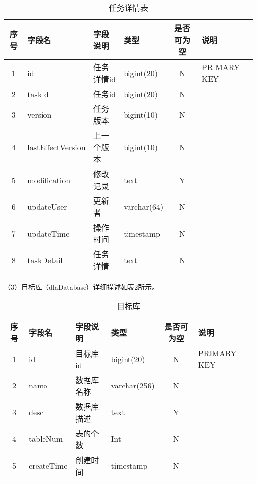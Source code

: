 \begin{table}[H]
  \centering
  \caption{任务详情表}
  \label{tab:任务详情表}
  \begin{tabular}{clllcl}
    \toprule
    序号  & 字段名              & 字段说明     & 类型           & 是否可为空   & 说明  \\
    \midrule
    1    & id                 & 任务详情id   & bigint(20)     & N          & PRIMARY KEY    \\
    2    & taskId             & 任务id      & bigint(20)     & N          &    \\
    3    & version            & 任务版本     & bigint(10)     & N          &   \\
    4    & lastEffectVersion  & 上一个版本   & bigint(10)     & N          &   \\
    5    & modification       & 修改记录     & text           & Y          &   \\
    6    & updateUser         & 更新者       & varchar(64)   & N          &    \\
    7    & updateTime         & 操作时间     & timestamp      & N          &   \\
    8    & taskDetail         & 任务详情     & text           & N          &   \\
    \bottomrule
  \end{tabular}
\end{table}

（3）目标库（dlaDatabase）详细描述如表\ref{tab:目标库}所示。

\begin{table}[H]
  \centering
  \caption{目标库}
  \label{tab:目标库}
  \begin{tabular}{clllcl}
    \toprule
    序号  & 字段名              & 字段说明     & 类型           & 是否可为空   & 说明  \\
    \midrule
    1    & id                 & 目标库id     & bigint(20)    & N          & PRIMARY KEY    \\
    2    & name               & 数据库名称    & varchar(256)  & N          &    \\
    3    & desc               & 数据库描述    & text          & Y          &   \\
    4    & tableNum           & 表的个数      & Int           & N          &   \\
    5    & createTime         & 创建时间      & timestamp     & N          &   \\
    \bottomrule
  \end{tabular}
\end{table}

